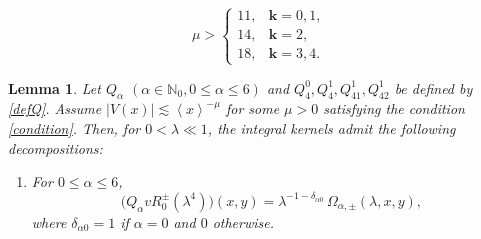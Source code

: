 \documentclass[10pt,a4paper]{amsart}
\newtheorem{lemma}{Lemma}
\begin{document}
\begin{equation}\label{condition}
	\mu> \begin{cases}11, & \mathbf{k}=0,1, \\
14, &  \mathbf{k}=2,\\
18, & \mathbf{k}=3,4. \end{cases}
		\end{equation}

\begin{lemma}\label{lemma_projection}
	Let $Q_\alpha$ $(\alpha\in\mathbb{N}_0, 0\le\alpha\le6)$ and $Q_4^0, Q_4^1, Q_{41}^1, Q_{42}^1$ be defined by \eqref{defQ}. Assume $\left|V(x)\right| \lesssim \left \langle  x\right \rangle^{-\mu}$ for some $\mu>0$ satisfying the condition \eqref{condition}. Then, for $0<\lambda\ll1$, the integral kernels admit the following decompositions:
	\begin{enumerate}
		\item[(i)] For $0\le\alpha\le6$,
		\[
		\bigl(Q_\alpha v R_0^\pm(\lambda^4)\bigr)(x,y)=\lambda^{-1-\delta_{\alpha0}}\,\Omega_{\alpha,\pm}(\lambda,x,y),
		\]
		where $\delta_{\alpha0}=1$ if $\alpha=0$ and $0$ otherwise.
		

\end{enumerate}
\end{lemma}
\end{document}

